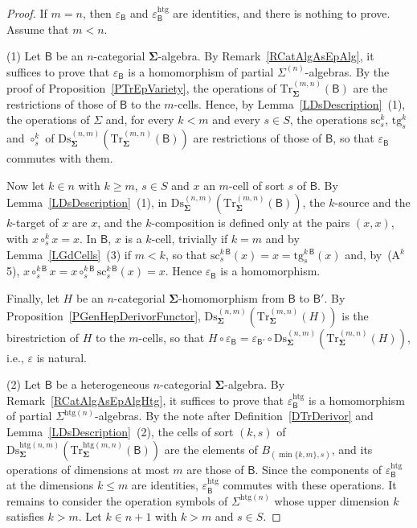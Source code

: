 \documentclass[a4paper, reqno]{amsbook}
\newcommand{\sig}[1]{\mathbf{#1}}             %
\newcommand{\calg}[1]{\boldsymbol{\mathsf{#1}}} %
\newcommand{\htg}{\mathrm{htg}}                %
\newcommand{\src}{\mathrm{sc}}
\newcommand{\tgt}{\mathrm{tg}}
\newcommand{\Ds}{\mathrm{Ds}}
\newcommand{\Tr}{\mathrm{Tr}}
\theoremstyle{plain}
\theoremstyle{definition}
\begin{document}
\begin{proof}
If $m=n$, then $\varepsilon_{\calg{B}}$ and $\varepsilon^{\htg}_{\calg{B}}$ are identities, and there is nothing to prove.
Assume that $m<n$.

(1) Let $\calg{B}$ be an $n$-categorial $\sig{\Sigma}$-algebra.
By Remark~\ref{RCatAlgAsEpAlg}, it suffices to prove that $\varepsilon_{\calg{B}}$ is a homomorphism of partial $\Sigma^{(n)}$-algebras.
By the proof of Proposition~\ref{PTrEpVariety}, the operations of $\Tr^{(m,n)}_{\sig{\Sigma}}(\calg{B})$ are the restrictions of those of $\calg{B}$ to the $m$-cells.
Hence, by Lemma~\ref{LDsDescription}~(1), the operations of $\Sigma$ and, for every $k<m$ and every $s\in S$, the operations $\src^{k}_{s}$, $\tgt^{k}_{s}$ and $\circ^{k}_{s}$ of $\Ds^{(n,m)}_{\sig{\Sigma}}(\Tr^{(m,n)}_{\sig{\Sigma}}(\calg{B}))$ are restrictions of those of $\calg{B}$, so that $\varepsilon_{\calg{B}}$ commutes with them.

Now let $k\in n$ with $k\geq m$, $s\in S$ and $x$ an $m$-cell of sort $s$ of $\calg{B}$.
By Lemma~\ref{LDsDescription}~(1), in $\Ds^{(n,m)}_{\sig{\Sigma}}(\Tr^{(m,n)}_{\sig{\Sigma}}(\calg{B}))$, the $k$-source and the $k$-target of $x$ are $x$, and the $k$-composition is defined only at the pairs $(x,x)$, with $x\circ^{k}_{s}x=x$.
In $\calg{B}$, $x$ is a $k$-cell, trivially if $k=m$ and by Lemma~\ref{LGdCells}~(3) if $m<k$, so that $\src^{k\,\calg{B}}_{s}(x)=x=\tgt^{k\,\calg{B}}_{s}(x)$ and, by~(A$^{k}$5), $x\circ^{k\,\calg{B}}_{s}x=x\circ^{k\,\calg{B}}_{s}\src^{k\,\calg{B}}_{s}(x)=x$.
Hence $\varepsilon_{\calg{B}}$ is a homomorphism.

Finally, let $H$ be an $n$-categorial $\sig{\Sigma}$-homomorphism from $\calg{B}$ to $\calg{B}'$.
By Proposition~\ref{PGenHepDerivorFunctor}, $\Ds^{(n,m)}_{\sig{\Sigma}}(\Tr^{(m,n)}_{\sig{\Sigma}}(H))$ is the birestriction of $H$ to the $m$-cells, so that $H\circ\varepsilon_{\calg{B}}=\varepsilon_{\calg{B}'}\circ\Ds^{(n,m)}_{\sig{\Sigma}}(\Tr^{(m,n)}_{\sig{\Sigma}}(H))$, i.e., $\varepsilon$ is natural.

(2) Let $\calg{B}$ be a heterogeneous $n$-categorial $\sig{\Sigma}$-algebra.
By Remark~\ref{RCatAlgAsEpAlgHtg}, it suffices to prove that $\varepsilon^{\htg}_{\calg{B}}$ is a homomorphism of partial $\Sigma^{\htg(n)}$-algebras.
By the note after Definition~\ref{DTrDerivor} and Lemma~\ref{LDsDescription}~(2), the cells of sort $(k,s)$ of $\Ds^{\htg(n,m)}_{\sig{\Sigma}}(\Tr^{\htg(m,n)}_{\sig{\Sigma}}(\calg{B}))$ are the elements of $B_{(\min\{k,m\},s)}$, and its operations of dimensions at most $m$ are those of $\calg{B}$.
Since the components of $\varepsilon^{\htg}_{\calg{B}}$ at the dimensions $k\leq m$ are identities, $\varepsilon^{\htg}_{\calg{B}}$ commutes with these operations.
It remains to consider the operation symbols of $\Sigma^{\htg(n)}$ whose upper dimension $k$ satisfies $k>m$.
Let $k\in n+1$ with $k>m$ and $s\in S$.


\end{proof}
\end{document}
